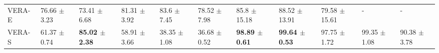 \begin{tabular}{lllllllllll}
VERA-E &            76.66 {\footnotesize $\pm$ 3.23} &             73.41 {\footnotesize $\pm$ 6.68} &            81.31 {\footnotesize $\pm$ 3.92} &              83.6 {\footnotesize $\pm$ 7.45} &            78.52 {\footnotesize $\pm$ 7.98} &             85.8 {\footnotesize $\pm$ 15.18} &            88.52 {\footnotesize $\pm$ 13.91} &            79.58 {\footnotesize $\pm$ 15.61} &                                           - &                                            - \\
VERA-S &            61.37 {\footnotesize $\pm$ 0.74} &  \bfseries{85.02 {\footnotesize $\pm$ 2.38}} &            58.91 {\footnotesize $\pm$ 3.66} &             38.35 {\footnotesize $\pm$ 1.08} &            36.68 {\footnotesize $\pm$ 0.52} &  \bfseries{98.89 {\footnotesize $\pm$ 0.61}} &  \bfseries{99.64 {\footnotesize $\pm$ 0.53}} &             97.75 {\footnotesize $\pm$ 1.72} &            99.35 {\footnotesize $\pm$ 1.08} &             90.38 {\footnotesize $\pm$ 3.78} \\
\bottomrule
\end{tabular}